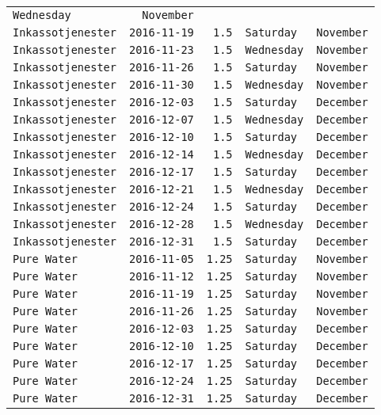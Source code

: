 \documentclass[11pt,A4paper,]{article}
\begin{document}
\begin{longtable}[]{@{}lrrll@{}}
\texttt{Wednesday} & \texttt{November}\tabularnewline
\texttt{Inkassotjenester} & \texttt{2016-11-19} & \texttt{1.5} &
\texttt{Saturday} & \texttt{November}\tabularnewline
\texttt{Inkassotjenester} & \texttt{2016-11-23} & \texttt{1.5} &
\texttt{Wednesday} & \texttt{November}\tabularnewline
\texttt{Inkassotjenester} & \texttt{2016-11-26} & \texttt{1.5} &
\texttt{Saturday} & \texttt{November}\tabularnewline
\texttt{Inkassotjenester} & \texttt{2016-11-30} & \texttt{1.5} &
\texttt{Wednesday} & \texttt{November}\tabularnewline
\texttt{Inkassotjenester} & \texttt{2016-12-03} & \texttt{1.5} &
\texttt{Saturday} & \texttt{December}\tabularnewline
\texttt{Inkassotjenester} & \texttt{2016-12-07} & \texttt{1.5} &
\texttt{Wednesday} & \texttt{December}\tabularnewline
\texttt{Inkassotjenester} & \texttt{2016-12-10} & \texttt{1.5} &
\texttt{Saturday} & \texttt{December}\tabularnewline
\texttt{Inkassotjenester} & \texttt{2016-12-14} & \texttt{1.5} &
\texttt{Wednesday} & \texttt{December}\tabularnewline
\texttt{Inkassotjenester} & \texttt{2016-12-17} & \texttt{1.5} &
\texttt{Saturday} & \texttt{December}\tabularnewline
\texttt{Inkassotjenester} & \texttt{2016-12-21} & \texttt{1.5} &
\texttt{Wednesday} & \texttt{December}\tabularnewline
\texttt{Inkassotjenester} & \texttt{2016-12-24} & \texttt{1.5} &
\texttt{Saturday} & \texttt{December}\tabularnewline
\texttt{Inkassotjenester} & \texttt{2016-12-28} & \texttt{1.5} &
\texttt{Wednesday} & \texttt{December}\tabularnewline
\texttt{Inkassotjenester} & \texttt{2016-12-31} & \texttt{1.5} &
\texttt{Saturday} & \texttt{December}\tabularnewline
\texttt{Pure\ Water} & \texttt{2016-11-05} & \texttt{1.25} &
\texttt{Saturday} & \texttt{November}\tabularnewline
\texttt{Pure\ Water} & \texttt{2016-11-12} & \texttt{1.25} &
\texttt{Saturday} & \texttt{November}\tabularnewline
\texttt{Pure\ Water} & \texttt{2016-11-19} & \texttt{1.25} &
\texttt{Saturday} & \texttt{November}\tabularnewline
\texttt{Pure\ Water} & \texttt{2016-11-26} & \texttt{1.25} &
\texttt{Saturday} & \texttt{November}\tabularnewline
\texttt{Pure\ Water} & \texttt{2016-12-03} & \texttt{1.25} &
\texttt{Saturday} & \texttt{December}\tabularnewline
\texttt{Pure\ Water} & \texttt{2016-12-10} & \texttt{1.25} &
\texttt{Saturday} & \texttt{December}\tabularnewline
\texttt{Pure\ Water} & \texttt{2016-12-17} & \texttt{1.25} &
\texttt{Saturday} & \texttt{December}\tabularnewline
\texttt{Pure\ Water} & \texttt{2016-12-24} & \texttt{1.25} &
\texttt{Saturday} & \texttt{December}\tabularnewline
\texttt{Pure\ Water} & \texttt{2016-12-31} & \texttt{1.25} &
\texttt{Saturday} & \texttt{December}\tabularnewline

\end{longtable}
\end{document}
